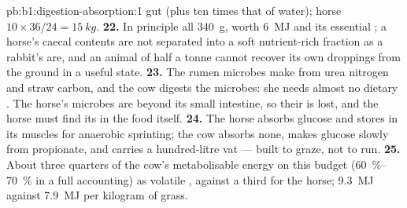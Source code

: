 \begin{solution}{pb:b1:digestion-absorption:1}
gut (plus ten times that of water); horse $10\times 36/24 =
\qty{15}{kg}$.
\textbf{22.} In principle all \qty{340}{g}, worth \qty{6}{MJ} and its
essential ; a horse's caecal contents are not separated
into a soft nutrient-rich fraction as a rabbit's are, and an animal of
half a tonne cannot recover its own droppings from the ground in a
useful state.
\textbf{23.} The rumen microbes make  from urea nitrogen and
straw carbon, and the cow digests the microbes: she needs almost no
dietary . The horse's microbes are beyond its small intestine,
so their  is lost, and the horse must find its  in
the food itself.
\textbf{24.} The horse absorbs glucose and stores  in its
muscles for anaerobic sprinting; the cow absorbs none, makes glucose
slowly from propionate, and carries a hundred-litre vat --- built to
graze, not to run.
\textbf{25.} About three quarters of the cow's metabolisable energy on
this budget (\qtyrange{60}{70}{\%} in a full accounting) as volatile
, against a third for the horse; \qty{9.3}{MJ} against
\qty{7.9}{MJ} per kilogram of grass.
\end{solution}
